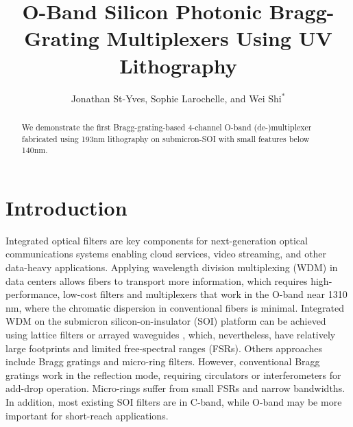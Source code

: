 \documentclass[letterpaper,10pt]{article}
\newcommand\todo[1]{\textcolor{red}{#1}}
\renewcommand\todo[1]{}  %
\begin{document}
\title{O-Band Silicon Photonic Bragg-Grating Multiplexers Using UV Lithography}

\author{Jonathan St-Yves, Sophie Larochelle, and Wei Shi$^*$}
\address{Centre d'optique, photonique et laser (COPL) and Département de génie électrique, Université Laval, 2375 rue de la Terrasse, Québec (Québec), Canada, G1V 0A6}

\begin{abstract}
We demonstrate the first Bragg-grating-based 4-channel O-band (de-)multiplexer fabricated using 193nm lithography on submicron-SOI with small features below 140nm.
\end{abstract}


\maketitle

\todo{A careful proof reading!!!  The spelling checker was not on in my Overleaf, so there might be quite errors.  Ask for help, e.g., Diane, if needed.}


\section{Introduction}

Integrated optical filters are key components for next-generation optical communications systems enabling cloud services, video streaming, and other data-heavy applications. Applying wavelength division multiplexing (WDM) in data centers allows fibers to transport more information, which requires high-performance, low-cost filters and multiplexers that work in the O-band near 1310 nm, where the chromatic dispersion in conventional fibers is minimal.
Integrated WDM on the submicron silicon-on-insulator (SOI) platform can be achieved using lattice filters\cite{horst2013cascaded} or arrayed waveguides \cite{okamoto2013fabrication}, which, nevertheless, have relatively large footprints and limited free-spectral ranges (FSRs). Others  approaches include Bragg gratings\cite{simard2012apodized} and micro-ring filters\cite{xu2006cascaded}. However, conventional Bragg gratings work in the reflection mode, requiring circulators or interferometers for add-drop operation. Micro-rings suffer from small FSRs and narrow bandwidths. In addition, most existing SOI filters are in C-band, while O-band may be more important for short-reach applications.
\end{document}
